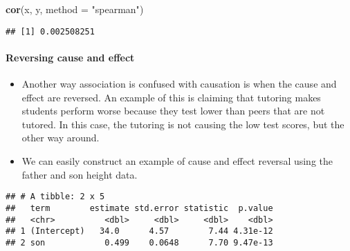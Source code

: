 \documentclass[]{article}
\newenvironment{Shaded}{\begin{snugshade}}{\end{snugshade}}
\newcommand{\DataTypeTok}[1]{\textcolor[rgb]{0.13,0.29,0.53}{#1}}
\newcommand{\DecValTok}[1]{\textcolor[rgb]{0.00,0.00,0.81}{#1}}
\newcommand{\KeywordTok}[1]{\textcolor[rgb]{0.13,0.29,0.53}{\textbf{#1}}}
\newcommand{\NormalTok}[1]{#1}
\newcommand{\OperatorTok}[1]{\textcolor[rgb]{0.81,0.36,0.00}{\textbf{#1}}}
\newcommand{\StringTok}[1]{\textcolor[rgb]{0.31,0.60,0.02}{#1}}
\providecommand{\tightlist}{%
  \setlength{\itemsep}{0pt}\setlength{\parskip}{0pt}}
\let\oldparagraph\paragraph
\renewcommand{\paragraph}[1]{\oldparagraph{#1}\mbox{}}
\begin{document}
\begin{Shaded}
\begin{Highlighting}[]
\KeywordTok{cor}\NormalTok{(x, y, }\DataTypeTok{method =} \StringTok{"spearman"}\NormalTok{)}
\end{Highlighting}
\end{Shaded}

\begin{verbatim}
## [1] 0.002508251
\end{verbatim}

\hypertarget{reversing-cause-and-effect}{%
\paragraph{Reversing cause and
effect}\label{reversing-cause-and-effect}}

\begin{itemize}
\tightlist
\item
  Another way association is confused with causation is when the cause
  and effect are reversed. An example of this is claiming that tutoring
  makes students perform worse because they test lower than peers that
  are not tutored. In this case, the tutoring is not causing the low
  test scores, but the other way around.
\item
  We can easily construct an example of cause and effect reversal using
  the father and son height data.
\end{itemize}

\begin{Shaded}
\end{Shaded}

\begin{verbatim}
## # A tibble: 2 x 5
##   term        estimate std.error statistic  p.value
##   <chr>          <dbl>     <dbl>     <dbl>    <dbl>
## 1 (Intercept)   34.0      4.57        7.44 4.31e-12
## 2 son            0.499    0.0648      7.70 9.47e-13
\end{verbatim}
\end{document}

